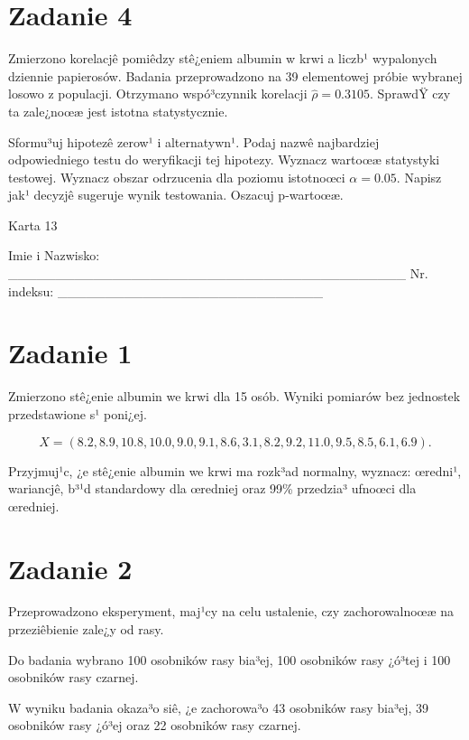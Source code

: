 \documentclass[a4paper,12pt]{article}
\begin{document}
  \section*{Zadanie 4}
     
     Zmierzono korelacjê pomiêdzy stê¿eniem albumin w krwi a liczb¹ wypalonych dziennie papierosów. 
     Badania przeprowadzono na 39 elementowej próbie wybranej losowo z populacji. 
     Otrzymano wspó³czynnik korelacji $\hat\rho = 0.3105 $. 
     SprawdŸ czy ta zale¿noœæ jest istotna statystycznie. 
     
     Sformu³uj hipotezê zerow¹ i alternatywn¹. 
     Podaj nazwê najbardziej odpowiedniego testu do weryfikacji tej hipotezy. 
     Wyznacz wartoœæ statystyki testowej. 
     Wyznacz obszar odrzucenia dla poziomu istotnoœci $\alpha=0.05$. 
     Napisz jak¹ decyzjê sugeruje wynik testowania. 
     Oszacuj p-wartoœæ. \vspace{1cm} 

  \clearpage  Karta  13  

 Imie i Nazwisko: \_\_\_\_\_\_\_\_\_\_\_\_\_\_\_\_\_\_\_\_\_\_\_\_\_\_\_\_\_\_\_\_\_\_\_\_\_\_\_\_\_\_ Nr. indeksu: \_\_\_\_\_\_\_\_\_\_\_\_\_\_\_\_\_\_\_\_\_\_\_\_\_\_\_\_ 
 \section*{Zadanie 1}
     
     Zmierzono stê¿enie albumin we krwi dla 15 osób. 
     Wyniki pomiarów bez jednostek przedstawione s¹ poni¿ej. 
     
     \noindent $$X=(  8.2,  8.9, 10.8, 10.0,  9.0,  9.1,  8.6,  3.1,  8.2,  9.2, 11.0,  9.5,  8.5,  6.1,  6.9 ).$$
     
     Przyjmuj¹c, ¿e stê¿enie albumin we krwi ma rozk³ad normalny, 
     wyznacz: œredni¹, wariancjê, b³¹d standardowy dla œredniej oraz 99\% przedzia³ ufnoœci dla œredniej. \vspace{1cm} 

  \section*{Zadanie 2}
     
  Przeprowadzono eksperyment, maj¹cy na celu ustalenie, czy zachorowalnoœæ na przeziêbienie zale¿y od rasy.
  
  Do badania wybrano 100 osobników rasy bia³ej, 100 osobników rasy ¿ó³tej i 100 osobników rasy czarnej. 
  
  W wyniku badania okaza³o siê, ¿e zachorowa³o 43 osobników rasy bia³ej, 39 osobników rasy ¿ó³ej oraz 22 osobników rasy czarnej. 
  
\end{document}
